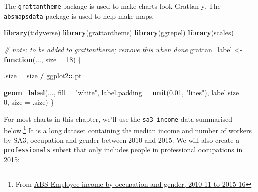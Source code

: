 \documentclass[]{book}
\newenvironment{Shaded}{\begin{snugshade}}{\end{snugshade}}
\newcommand{\CommentTok}[1]{\textcolor[rgb]{0.56,0.35,0.01}{\textit{#1}}}
\newcommand{\ControlFlowTok}[1]{\textcolor[rgb]{0.13,0.29,0.53}{\textbf{#1}}}
\newcommand{\DataTypeTok}[1]{\textcolor[rgb]{0.13,0.29,0.53}{#1}}
\newcommand{\DecValTok}[1]{\textcolor[rgb]{0.00,0.00,0.81}{#1}}
\newcommand{\FloatTok}[1]{\textcolor[rgb]{0.00,0.00,0.81}{#1}}
\newcommand{\KeywordTok}[1]{\textcolor[rgb]{0.13,0.29,0.53}{\textbf{#1}}}
\newcommand{\NormalTok}[1]{#1}
\newcommand{\OperatorTok}[1]{\textcolor[rgb]{0.81,0.36,0.00}{\textbf{#1}}}
\newcommand{\StringTok}[1]{\textcolor[rgb]{0.31,0.60,0.02}{#1}}
\let\rmarkdownfootnote\footnote%
\def\footnote{\protect\rmarkdownfootnote}
\begin{document}
The \texttt{grattantheme} package is used to make charts look Grattan-y. The \texttt{absmapsdata} package is used to help make maps.

\begin{Shaded}
\begin{Highlighting}[]
\KeywordTok{library}\NormalTok{(tidyverse)}
\KeywordTok{library}\NormalTok{(grattantheme)}
\KeywordTok{library}\NormalTok{(ggrepel)}
\KeywordTok{library}\NormalTok{(scales)}
\end{Highlighting}
\end{Shaded}

\begin{Shaded}
\begin{Highlighting}[]
\CommentTok{# note: to be added to grattantheme; remove this when done}
\NormalTok{grattan_label <-}\StringTok{ }\ControlFlowTok{function}\NormalTok{(..., }\DataTypeTok{size =} \DecValTok{18}\NormalTok{) \{}

\NormalTok{  .size =}\StringTok{ }\NormalTok{size }\OperatorTok{/}\StringTok{ }\NormalTok{ggplot2}\OperatorTok{::}\NormalTok{.pt}
  
\KeywordTok{geom_label}\NormalTok{(..., }
           \DataTypeTok{fill =} \StringTok{"white"}\NormalTok{,}
           \DataTypeTok{label.padding =} \KeywordTok{unit}\NormalTok{(}\FloatTok{0.01}\NormalTok{, }\StringTok{"lines"}\NormalTok{), }
           \DataTypeTok{label.size =} \DecValTok{0}\NormalTok{,}
           \DataTypeTok{size =}\NormalTok{ .size)}
\NormalTok{\}}
\end{Highlighting}
\end{Shaded}

For most charts in this chapter, we'll use the \texttt{sa3\_income} data summarised below.\footnote{From \href{https://www.abs.gov.au/AUSSTATS/abs@.nsf/DetailsPage/6524.0.55.0022011-2016?OpenDocument}{ABS Employee income by occupation and gender, 2010-11 to 2015-16}} It is a long dataset containing the median income and number of workers by SA3, occupation and gender between 2010 and 2015. We will also create a \texttt{professionals} subset that only includes people in professional occupations in 2015:
\end{document}
